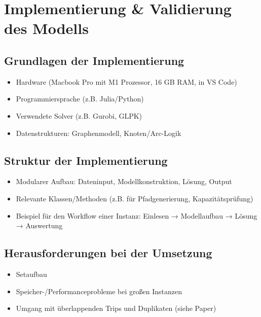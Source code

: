 \chapter{Implementierung \& Validierung des Modells}
\section{Grundlagen der Implementierung}
\begin{itemize}
    \item Hardware (Macbook Pro mit M1 Prozessor, 16 GB RAM, in VS Code)
    \item Programmiersprache (z.B. Julia/Python)
    \item Verwendete Solver (z.B. Gurobi, GLPK)
    \item Datenstrukturen: Graphenmodell, Knoten/Arc-Logik
\end{itemize}
\section{Struktur der Implementierung}
\begin{itemize}
    \item Modularer Aufbau: Dateninput, Modellkonstruktion, Lösung, Output
    \item Relevante Klassen/Methoden (z.B. für Pfadgenerierung, Kapazitätsprüfung)
    \item Beispiel für den Workflow einer Instanz: Einlesen → Modellaufbau → Lösung → Auswertung
\end{itemize}

\section{Herausforderungen bei der Umsetzung}
\begin{itemize}
    \item Setaufbau
    \item Speicher-/Performanceprobleme bei großen Instanzen
    \item Umgang mit überlappenden Trips und Duplikaten (siehe Paper)
\end{itemize}

